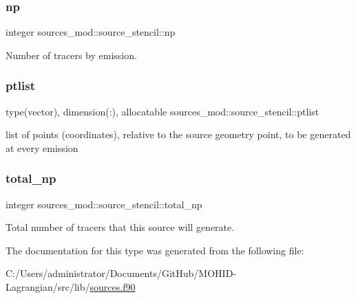 \subsubsection{\texorpdfstring{np}{np}}
{\footnotesize\ttfamily integer sources\+\_\+mod\+::source\+\_\+stencil\+::np\hspace{0.3cm}{\ttfamily [private]}}



Number of tracers by emission. 

\mbox{\label{structsources__mod_1_1source__stencil_a154e50e2872650da574d0a1148e3065a}} 
\subsubsection{\texorpdfstring{ptlist}{ptlist}}
{\footnotesize\ttfamily type(vector), dimension(\+:), allocatable sources\+\_\+mod\+::source\+\_\+stencil\+::ptlist\hspace{0.3cm}{\ttfamily [private]}}



list of points (coordinates), relative to the source geometry point, to be generated at every emission 

\mbox{\label{structsources__mod_1_1source__stencil_ad7373d51bdf50a4595b6c0fa69f7f915}} 
\subsubsection{\texorpdfstring{total\+\_\+np}{total\_np}}
{\footnotesize\ttfamily integer sources\+\_\+mod\+::source\+\_\+stencil\+::total\+\_\+np\hspace{0.3cm}{\ttfamily [private]}}



Total number of tracers that this source will generate. 



The documentation for this type was generated from the following file\+:\begin{DoxyCompactItemize}
\item 
C\+:/\+Users/administrator/\+Documents/\+Git\+Hub/\+M\+O\+H\+I\+D-\/\+Lagrangian/src/lib/\hyperlink{sources_8f90}{sources.\+f90}\end{DoxyCompactItemize}

